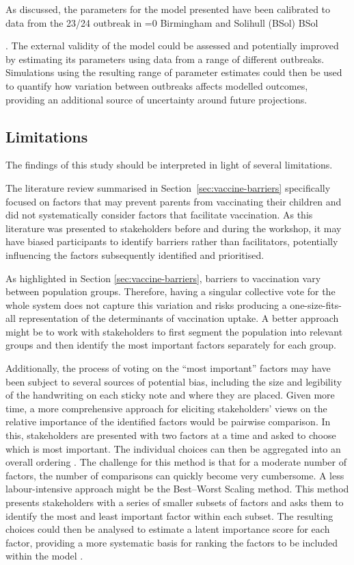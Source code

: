\documentclass[12pt]{article}
\newcounter{bsol}
\newcommand{\bsol}{%
    \ifnum\value{bsol}=0
        \stepcounter{bsol}%
        Birmingham and Solihull (BSol)%
        \else
        BSol%
    \fi%
    \xspace
}
\newcounter{who}
\begin{document}
As discussed, the parameters for the model presented have been calibrated to data from the 23/24 outbreak in \bsol. The external validity of the model could be assessed and potentially improved by estimating its parameters using data from a range of different outbreaks. Simulations using the resulting range of parameter estimates could then be used to quantify how variation between outbreaks affects modelled outcomes, providing an additional source of uncertainty around future projections.


\subsection{Limitations}

The findings of this study should be interpreted in light of several limitations. 

The literature review summarised in Section~\ref{sec:vaccine-barriers} specifically focused on factors that may prevent parents from vaccinating their children and did not systematically consider factors that facilitate vaccination. As this literature was presented to stakeholders before and during the workshop, it may have biased participants to identify barriers rather than facilitators, potentially influencing the factors subsequently identified and prioritised.

As highlighted in Section \ref{sec:vaccine-barriers}, barriers to vaccination vary between population groups. Therefore, having a singular collective vote for the whole system does not capture this variation and risks producing a one-size-fits-all representation of the determinants of vaccination uptake. A better approach might be to work with stakeholders to first segment the population into relevant groups and then identify the most important factors separately for each group.

Additionally, the process of voting on the ``most important'' factors may have been subject to several sources of potential bias, including the size and legibility of the handwriting on each sticky note and where they are placed. Given more time, a more comprehensive approach for eliciting stakeholders' views on the relative importance of the identified factors would be pairwise comparison. In this, stakeholders are presented with two factors at a time and asked to choose which is most important. The individual choices can then be aggregated into an overall ordering \cite{van2014does}. The challenge for this method is that for a moderate number of factors, the number of comparisons can quickly become very cumbersome. A less labour-intensive approach might be the Best–Worst Scaling method. This method presents stakeholders with a series of smaller subsets of factors and asks them to identify the most and least important factor within each subset. The resulting choices could then be analysed to estimate a latent importance score for each factor, providing a more systematic basis for ranking the factors to be included within the model \cite{hollin2022best}. 
\end{document}
